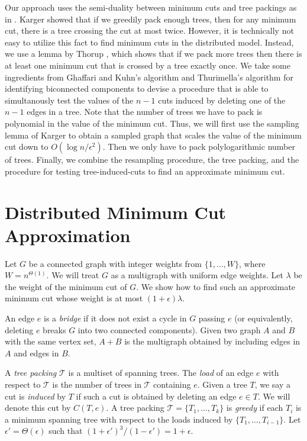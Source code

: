 \documentclass[11pt]{article}
\begin{document}
Our approach uses the semi-duality between minimum cuts and tree packings as in \cite{Karger2000, Thorup07}. Karger \cite{Karger2000} showed that if we greedily pack enough trees, then for any minimum cut, there is a tree crossing the cut at most twice. However, it is technically not easy to utilize this fact to find minimum cuts in the distributed model. Instead, we use a lemma by Thorup \cite{Thorup07}, which shows that if we pack more trees then there is at least one minimum cut that is crossed by a tree exactly once. We take some ingredients from Ghaffari and Kuhn's algorithm and Thurimella's algorithm \cite{Thurimella97} for identifying biconnected components to devise a procedure that is able to simultanously test the values of the $n-1$ cuts induced by deleting one of the $n-1$ edges in a tree. Note that the number of trees we have to pack is polynomial in the value of the minimum cut. Thus, we will first use the sampling lemma of Karger \cite{Karger94} to obtain a sampled graph that scales the value of the minimum cut down to $O(\log n / \epsilon^2)$. Then we only have to pack polylogarithmic number of trees. Finally, we combine the resampling procedure, the tree packing, and the procedure for testing tree-induced-cuts to find an approximate minimum cut.


\section{Distributed Minimum Cut Approximation}
Let $G$ be a connected graph with integer weights from $\{1,\ldots,W \}$, where $W = n^{\Theta(1)}$. We will treat $G$ as a multigraph with uniform edge weights.
Let $\lambda$ be the weight of the minimum cut of $G$. We show how to find such an approximate minimum cut whose weight is at most $(1+\epsilon)\lambda$. 

An edge $e$ is a {\it bridge} if it does not exist a cycle in $G$ passing $e$ (or equivalently, deleting $e$ breaks $G$ into two connected components). Given two graph $A$ and $B$ with the same vertex set, $A+B$ is the multigraph obtained by including edges in $A$ and edges in $B$.

A {\it tree packing} $\mathcal{T}$ is a multiset of spanning trees. The {\it load} of an edge $e$ with respect to $\mathcal{T}$ is the number of trees in $\mathcal{T}$ containing $e$. Given a tree $T$, we say a cut is {\it induced} by $T$ if such a cut is obtained by deleting an edge $e \in T$. We will denote this cut by $C(T,e)$. A tree packing $\mathcal{T} = \{T_1, \ldots, T_k \}$ is {\it greedy} if each $T_i$ is a minimum spanning tree with respect to the loads induced by $\{T_1,\ldots, T_{i-1} \}$. Let $\epsilon' = \Theta(\epsilon)$ such that $(1+\epsilon')^{3} / (1-\epsilon') = 1 + \epsilon$.
\end{document}

